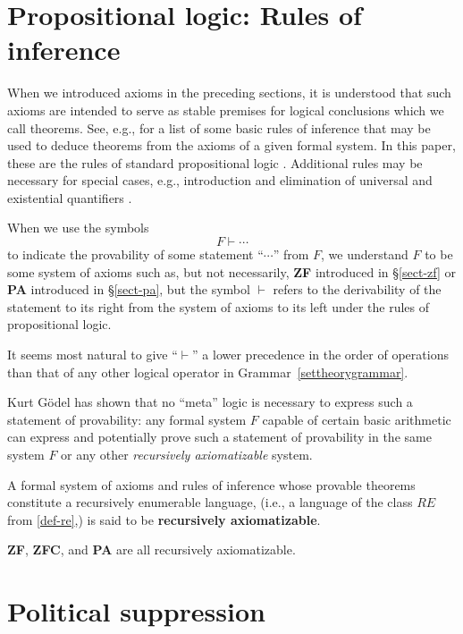 \documentclass[letterpaper]{article}
\newcommand{\Definition}{\raisebox{-0.25ex}{\large\dsliterary}}
\begin{document}
\section{Propositional logic: Rules of inference}
When we introduced axioms in the preceding sections, it is understood that such axioms are intended to serve as stable premises for logical conclusions which we call theorems. See, e.g., \cite{moura2010} for a list of some basic rules of inference that may be used to deduce theorems from the axioms of a given formal system.  In this paper, these are the rules of standard propositional logic \cite{klement0000}.  Additional rules may be necessary for special cases, e.g., introduction and elimination of universal and existential quantifiers \cite{prawitz2006}.

When we use the symbols
\begin{equation}
F\vdash\cdots
\end{equation}
to indicate the provability of some statement ``$\cdots$'' from $F$,
we understand $F$ to be some system of axioms such as, but not necessarily, \textbf{ZF} introduced in \S \ref{sect-zf} or \textbf{PA} introduced in \S \ref{sect-pa}, but the symbol $\vdash$ refers to the derivability of the statement to its right from the system of axioms to its left under the rules of propositional logic.
\begin{remark}
	It seems most natural to give ``$\vdash$'' a lower precedence in the order of operations than that of any other logical operator in Grammar~\ref{settheorygrammar}.
\end{remark}
Kurt G{\"o}del has shown that no ``meta'' logic is necessary to express such a statement of provability:  any formal system $F$ capable of certain basic arithmetic can express and potentially prove such a statement of provability in the same system $F$ or any other \textit{recursively axiomatizable} system.
\begin{definition}A formal system of axioms and rules of inference whose provable theorems constitute a recursively enumerable language, (i.e., a language of the class $RE$ from \Definition \ref{def-re},) is said to be \textbf{recursively axiomatizable}.
\end{definition}
\begin{remark}
\textbf{ZF}, \textbf{ZFC}, and \textbf{PA} are all recursively axiomatizable.
\end{remark}

\section{Political suppression}
\end{document}
